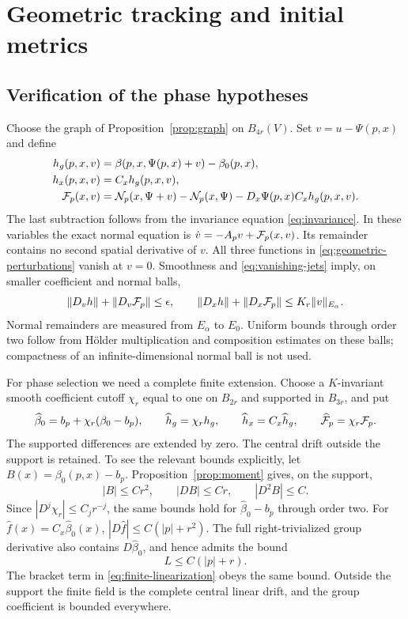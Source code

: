\section{Geometric tracking and initial metrics}\label{sec:geometric}

\subsection{Verification of the phase hypotheses}
Choose the graph of Proposition~\ref{prop:graph} on $B_{4r}(V)$.
Set $v=u-\Psi(p,x)$ and define
\begin{equation}\label{eq:geometric-perturbations}
 \begin{split}
 h_g(p,x,v)&=\beta(p,x,\Psi(p,x)+v)-\beta_0(p,x),\\
 h_x(p,x,v)&=C_xh_g(p,x,v),\\
 \mathcal F_p(x,v)&=\mathcal N_p(x,\Psi+v)-\mathcal N_p(x,\Psi)
                         -D_x\Psi(p,x)C_xh_g(p,x,v).
 \end{split}
\end{equation}
The last subtraction follows from the invariance equation
\eqref{eq:invariance}. In these variables the exact normal equation is
$\dot v=-A_pv+\mathcal F_p(x,v)$. Its remainder contains no second
spatial derivative of $v$. All three functions in
\eqref{eq:geometric-perturbations} vanish at $v=0$.
Smoothness and \eqref{eq:vanishing-jets} imply, on smaller
coefficient and normal balls,
\begin{equation}\label{eq:geometric-smallness}
 \|D_vh\|+\|D_v\mathcal F_p\|\le\epsilon,\qquad
 \|D_xh\|+\|D_x\mathcal F_p\|\le K_r\|v\|_{E_\alpha}.
\end{equation}
Normal remainders are measured from $E_\alpha$ to $E_0$.
Uniform bounds through order two follow from H\"older
multiplication and composition estimates on these balls;
compactness of an infinite-dimensional normal ball is not used.

For phase selection we need a complete finite extension.
Choose a $K$-invariant smooth coefficient cutoff $\chi_r$
equal to one on $B_{2r}$ and supported in $B_{3r}$, and put
\begin{equation}\label{eq:cutoff}
 \widehat\beta_0=b_p+\chi_r(\beta_0-b_p),\qquad
 \widehat h_g=\chi_rh_g,\qquad
 \widehat h_x=C_x\widehat h_g,\qquad
 \widehat{\mathcal F}_p=\chi_r\mathcal F_p.
\end{equation}
The supported differences are extended by zero.
The central drift outside the support is retained.
To see the relevant bounds explicitly, let $B(x)=\beta_0(p,x)-b_p$.
Proposition~\ref{prop:moment} gives, on the support,
\[
 |B|\le Cr^2,\qquad |DB|\le Cr,\qquad |D^2B|\le C.
\]
Since $|D^j\chi_r|\le C_jr^{-j}$, the same bounds hold
for $\widehat\beta_0-b_p$ through order two.
For $\widehat f(x)=C_x\widehat\beta_0(x)$,
$|D\widehat f|\le C(|p|+r^2)$.
The full right-trivialized group derivative also contains
$D\widehat\beta_0$, and hence admits the bound
\begin{equation}\label{eq:finite-L}
 L\le C(|p|+r).
\end{equation}
The bracket term in \eqref{eq:finite-linearization} obeys
the same bound. Outside the support the finite field is
the complete central linear drift, and the group coefficient
is bounded everywhere.

